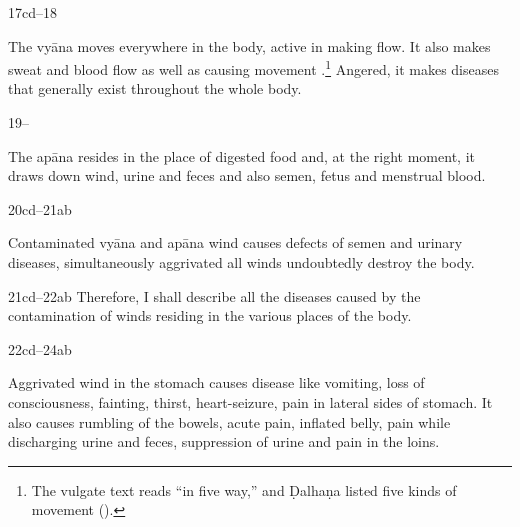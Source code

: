 \begin{translation}
\item[17cd--18] 

The vyāna moves everywhere in the body, active in making
 flow.   It also makes sweat and blood flow as well as
causing movement .\footnote{The vulgate text
    reads  “in five way,” and Ḍalhaṇa listed five kinds of
    movement ().} Angered, it  makes diseases that
    generally exist throughout the whole body.
    
    \item [19--]
    
The apāna resides in the place of digested food and, at the right moment, it 
draws down wind, urine and feces and also semen, fetus and menstrual blood. 



%

\item[20cd--21ab]

Contaminated vyāna and apāna wind causes defects of semen and urinary diseases,
simultaneously aggrivated all winds undoubtedly destroy the body.


\item[21cd--22ab] Therefore, I shall describe all the diseases caused by the 
contamination of winds residing in the various places of the body.

\item[22cd--24ab] 

Aggrivated wind in the stomach causes disease like
vomiting, loss of consciousness, fainting, thirst, heart-seizure, pain in
lateral sides of stomach. It also causes rumbling of the bowels, acute
pain, inflated belly, pain while discharging urine and feces, suppression
of urine and pain in the loins.


\end{translation}
